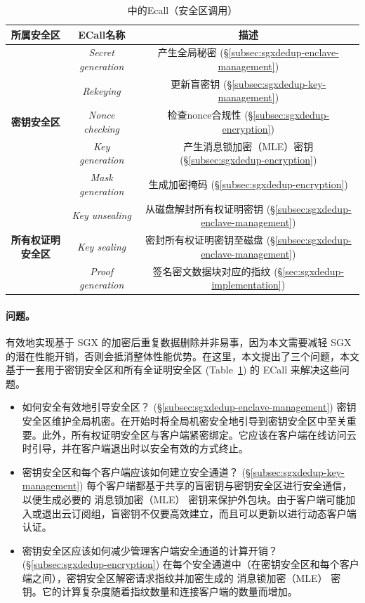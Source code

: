 \begin{table}[t]
\small
\centering
\begin{tabular}{ccc}
\toprule
{\bf 所属安全区} & {\bf ECall名称} & {\bf 描述}\\ 
\midrule
\multirow{5}{*}{\bf 密钥安全区}
& \textit{ Secret generation} & 产生全局秘密 
(\S\ref{subsec:sgxdedup-enclave-management}) \\
& \textit{ Rekeying} & 更新盲密钥 
(\S\ref{subsec:sgxdedup-key-management}) \\
& \textit{ Nonce checking} & 检查nonce合规性 
(\S\ref{subsec:sgxdedup-encryption}) \\
& \textit{ Key generation} & 产生消息锁加密（MLE）密钥 (\S\ref{subsec:sgxdedup-encryption}) \\
& \textit{ Mask generation} & 生成加密掩码 (\S\ref{subsec:sgxdedup-encryption}) \\
\hline
\multirow{3}{*}{\bf 所有权证明安全区}
& \textit{ Key unsealing} & 从磁盘解封所有权证明密钥 (\S\ref{subsec:sgxdedup-enclave-management}) \\
& \textit{ Key sealing} & 密封所有权证明密钥至磁盘 (\S\ref{subsec:sgxdedup-enclave-management}) \\
& \textit{ Proof generation} & 签名密文数据块对应的指纹 
(\S\ref{sec:sgxdedup-implementation}) \\
\bottomrule
\end{tabular}
\vspace{-6pt}
\caption{\sysnameS 中的Ecall（安全区调用）}
\label{tab:sgxdedup-ecall}
\vspace{-3pt}
\end{table}

\paragraph*{问题。} 有效地​​实现基于 SGX 的加密后重复数据删除并非易事，因为本文需要减轻 SGX 的潜在性能开销，否则会抵消整体性能优势。在这里，本文提出了三个问题，本文基于一套用于密钥安全区和所有全证明安全区 (Table~\ref{tab:sgxdedup-ecall}) 的 ECall 来解决这些问题。

\begin{itemize}[leftmargin=*]
\item 如何安全有效地引导安全区？ (\S\ref{subsec:sgxdedup-enclave-management})
  密钥安全区维护全局机密。在开始时将全局机密安全地引导到密钥安全区中至关重要。此外，所有权证明安全区与客户端紧密绑定。它应该在客户端在线访问云时引导，并在客户端退出时以安全有效的方式终止。
\item 密钥安全区和每个客户端应该如何建立安全通道？ (\S\ref{subsec:sgxdedup-key-management})
  每个客户端都基于共享的盲密钥与密钥安全区进行安全通信，以便生成必要的 消息锁加密（MLE） 密钥来保护外包块。由于客户端可能加入或退出云订阅组，盲密钥不仅要高效建立，而且可以更新以进行动态客户端认证。
\item 密钥安全区应该如何减少管理客户端安全通道的计算开销？ (\S\ref{subsec:sgxdedup-encryption})
  在每个安全通道中（在密钥安全区和每个客户端之间），密钥安全区解密请求指纹并加密生成的 消息锁加密（MLE） 密钥。它的计算复杂度随着指纹数量和连接客户端的数量而增加。
\end{itemize}
